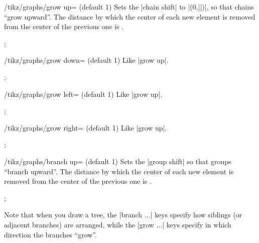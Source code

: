 \begin{key}{/tikz/graphs/grow up= (default 1)}
    Sets the |chain shift| to |(0,||)|, so that chains ``grow
    upward''. The distance by which the center of each new element is removed
    from the center of the previous one is .
\begin{codeexample}[preamble={\usetikzlibrary{graphs}}]
\tikz {};
\end{codeexample}
\end{key}

\begin{key}{/tikz/graphs/grow down= (default 1)}
    Like |grow up|.
\begin{codeexample}[preamble={\usetikzlibrary{graphs}}]
\tikz {};
\end{codeexample}
\end{key}

\begin{key}{/tikz/graphs/grow left= (default 1)}
    Like |grow up|.
\begin{codeexample}[preamble={\usetikzlibrary{graphs}}]
\tikz {};
\end{codeexample}
\end{key}

\begin{key}{/tikz/graphs/grow right= (default 1)}
    Like |grow up|.
\begin{codeexample}[preamble={\usetikzlibrary{graphs}}]
\tikz {};
\end{codeexample}
\end{key}

\begin{key}{/tikz/graphs/branch up= (default 1)}
    Sets the |group shift| so that groups ``branch upward''. The distance by
    which the center of each new element is removed from the center of the
    previous one is .
\begin{codeexample}[preamble={\usetikzlibrary{graphs}}]
\tikz {};
\end{codeexample}
    Note that when you draw a tree, the |branch ...| keys specify how siblings
    (or adjacent branches) are arranged, while the |grow ...| keys specify in
    which direction the branches ``grow''.
\end{key}

